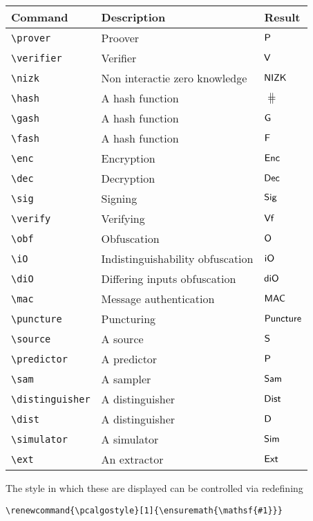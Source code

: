 \documentclass[a4paper]{report}
\begin{document}
\begin{center}
\begin{tabular}{l l l}
\textbf{Command} & \textbf{Description} & \textbf{Result} \\\hline
\lstinline$\prover$ & Proover & $\prover$  \\
\lstinline$\verifier$ & Verifier & $\verifier$  \\
\lstinline$\nizk$ & Non interactie zero knowledge & $\nizk$  \\
\lstinline$\hash$ & A hash function & $\hash$  \\
\lstinline$\gash$ & A hash function& $\gash$  \\
\lstinline$\fash$ & A hash function & $\fash$  \\
\lstinline$\enc$ & Encryption  & $\enc$  \\
\lstinline$\dec$ & Decryption & $\dec$  \\
\lstinline$\sig$ & Signing & $\sig$  \\
\lstinline$\verify$ & Verifying & $\verify$  \\
\lstinline$\obf$ & Obfuscation & $\obf$  \\
\lstinline$\iO$ & Indistinguishability obfuscation & $\iO$  \\
\lstinline$\diO$ & Differing inputs obfuscation & $\diO$  \\
\lstinline$\mac$ & Message authentication & $\mac$  \\
\lstinline$\puncture$ & Puncturing & $\puncture$  \\
\lstinline$\source$ & A source & $\source$  \\
\lstinline$\predictor$ & A predictor & $\predictor$  \\
\lstinline$\sam$ & A sampler & $\sam$  \\
\lstinline$\distinguisher$ & A distinguisher & $\distinguisher$  \\
\lstinline$\dist$ & A distinguisher& $\dist$  \\
\lstinline$\simulator$ & A simulator & $\simulator$  \\
\lstinline$\ext$ & An extractor & $\ext$  
\end{tabular}
\end{center}

The style in which these are displayed can be controlled via redefining
\begin{lstlisting}
\renewcommand{\pcalgostyle}[1]{\ensuremath{\mathsf{#1}}}
\end{lstlisting}
\end{document}
